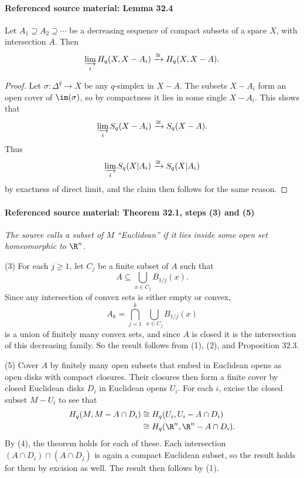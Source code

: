 \paragraph{Referenced source material: Lemma 32.4}
\begin{lemma}[32.4]
Let $A_1\supseteq A_2\supseteq\cdots$ be a decreasing sequence of compact subsets of a space $X$, with intersection $A$. Then
\[
\varinjlim_i H_q(X,X-A_i)\xrightarrow{\cong}H_q(X,X-A).
\]
\end{lemma}
\begin{proof}
Let $\sigma:\Delta^q\to X$ be any $q$-simplex in $X-A$. The subsets $X-A_i$ form an open cover of $\im(\sigma)$, so by compactness it lies in some single $X-A_i$. This shows that
\[
\varinjlim_i S_q(X-A_i)\xrightarrow{\cong}S_q(X-A).
\]
Thus
\[
\varinjlim_i S_q(X|A_i)\xrightarrow{\cong}S_q(X|A_i)
\]
by exactness of direct limit, and the claim then follows for the same reason.
\end{proof}
\paragraph{Referenced source material: Theorem 32.1, steps (3) and (5)}
\noindent\textit{The source calls a subset of $M$ ``Euclidean'' if it lies inside some open set homeomorphic to $\R^n$.}

(3) For each $j\geq1$, let $C_j$ be a finite subset of $A$ such that
\[
A\subseteq\bigcup_{x\in C_j}B_{1/j}(x).
\]
Since any intersection of convex sets is either empty or convex,
\[
A_k=\bigcap_{j=1}^k\ \bigcup_{x\in C_j}B_{1/j}(x)
\]
is a union of finitely many convex sets, and since $A$ is closed it is the intersection of this decreasing family. So the result follows from (1), (2), and Proposition 32.3.

(5) Cover $A$ by finitely many open subsets that embed in Euclidean opens as open disks with compact closures. Their closures then form a finite cover by closed Euclidean disks $D_i$ in Euclidean opens $U_i$. For each $i$, excise the closed subset $M-U_i$ to see that
\begin{align*}
H_q(M,M-A\cap D_i)&\cong H_q(U_i,U_i-A\cap D_i)\\
&\cong H_q(\R^n,\R^n-A\cap D_i).
\end{align*}
By (4), the theorem holds for each of these. Each intersection $(A\cap D_i)\cap(A\cap D_j)$ is again a compact Euclidean subset, so the result holds for them by excision as well. The result then follows by (1).

